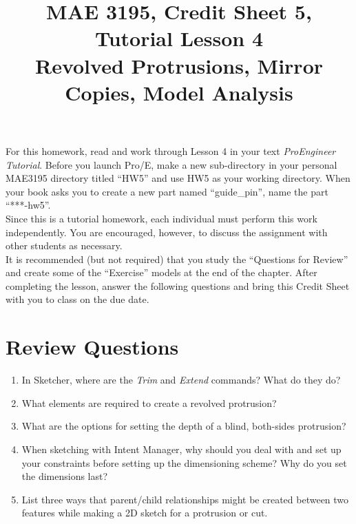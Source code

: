 \documentclass[12pt]{article}
\title{MAE 3195, Credit Sheet 5, Tutorial Lesson 4\\
Revolved Protrusions, Mirror Copies, Model Analysis}
\date{}
\begin{document}
\maketitle

For this homework, read and work through Lesson 4 in your text \textit{ProEngineer  Tutorial}. Before you launch Pro/E, make a new sub-directory in your personal MAE3195 directory titled ``HW5'' and use HW5 as your working directory. When your book asks you to create a new part named ``guide\_pin'', name the part ``***-hw5''.\\

Since this is a tutorial homework, each individual must perform this work independently. You are encouraged, however, to discuss the assignment with other students as necessary.\\

It is recommended (but not required) that you study the ``Questions for Review'' and create some of the ``Exercise'' models at the end of the chapter. After completing the lesson, answer the following questions and bring this Credit Sheet with you to class on the due date.

\pagebreak

\section*{Review Questions}
\begin{enumerate}
	\item In Sketcher, where are the \textit{Trim} and \textit{Extend} commands? What do they do?
	\vspace{1.25in}
	\item What elements are required to create a revolved protrusion?
	\vspace{1.25in}
	\item What are the options for setting the depth of a blind, both-sides protrusion?
	\vspace{1.25in}
	\item When sketching with Intent Manager, why should you deal with and set up your constraints before setting up the dimensioning scheme? Why do you set the dimensions last?
	\vspace{1.25in}
	\item List three ways that parent/child relationships might be created between two features while making a 2D sketch for a protrusion or cut.
\end{enumerate}
\end{document}
